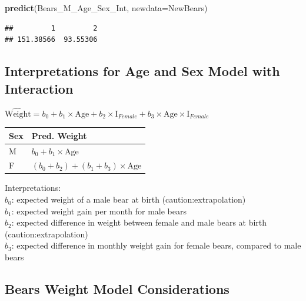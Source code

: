 \documentclass[]{book}
\newenvironment{Shaded}{\begin{snugshade}}{\end{snugshade}}
\newcommand{\KeywordTok}[1]{\textcolor[rgb]{0.13,0.29,0.53}{\textbf{#1}}}
\newcommand{\DataTypeTok}[1]{\textcolor[rgb]{0.13,0.29,0.53}{#1}}
\newcommand{\NormalTok}[1]{#1}
\begin{document}
\begin{Shaded}
\begin{Highlighting}[]
\KeywordTok{predict}\NormalTok{(Bears_M_Age_Sex_Int, }\DataTypeTok{newdata=}\NormalTok{NewBears)}
\end{Highlighting}
\end{Shaded}

\begin{verbatim}
##         1         2 
## 151.38566  93.55306
\end{verbatim}

\subsection{Interpretations for Age and Sex Model with
Interaction}\label{interpretations-for-age-and-sex-model-with-interaction}

\(\widehat{\text{Weight}}= b_0+ b_1 \times\text{Age}+ b_2\times\text{I}_{Female} + b_3\times\text{Age}\times\text{I}_{Female}\)

\begin{longtable}[]{@{}ll@{}}
\toprule
Sex & Pred. Weight\tabularnewline
\midrule
\endhead
M & \(b_0 + b_1 \times\text{Age}\)\tabularnewline
F & \((b_0 + b_2) + (b_1 + b_3) \times\text{Age}\)\tabularnewline
\bottomrule
\end{longtable}

Interpretations:\\
\(b_0\): expected weight of a male bear at birth
(caution:extrapolation)\\
\(b_1\): expected weight gain per month for male bears\\
\(b_2\): expected difference in weight between female and male bears at
birth (caution:extrapolation)\\
\(b_3\): expected difference in monthly weight gain for female bears,
compared to male bears

\subsection{Bears Weight Model
Considerations}\label{bears-weight-model-considerations}
\end{document}
